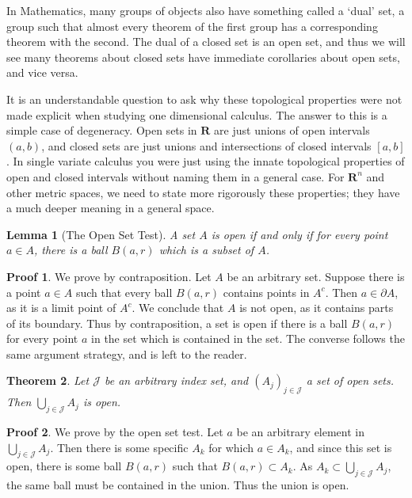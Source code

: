 \documentclass[12pt]{amsbook}
\theoremstyle{plain}
\newtheorem{theorem}{Theorem}
\newtheorem{lemma}[theorem]{Lemma}
\theoremstyle{definition}
\newtheorem*{prf}{Proof}
\begin{document}
In Mathematics, many groups of objects also have something called a `dual' set, a group such that almost every theorem of the first group has a corresponding theorem with the second. The dual of a closed set is an open set, and thus we will see many theorems about closed sets have immediate corollaries about open sets, and vice versa.

It is an understandable question to ask why these topological properties were not made explicit when studying one dimensional calculus. The answer to this is a simple case of degeneracy. Open sets in $\mathbf{R}$ are just unions of open intervals $(a,b)$, and closed sets are just unions and intersections of closed intervals $[a,b]$. In single variate calculus you were just using the innate topological properties of open and closed intervals without naming them in a general case. For $\mathbf{R}^n$ and other metric spaces, we need to state more rigorously these properties; they have a much deeper meaning in a general space.

\begin{lemma}[The Open Set Test]
  A set $A$ is open if and only if for every point $a \in A$, there is a ball $B(a,r)$ which is a subset of $A$.
\end{lemma}
\begin{prf}
  We prove by contraposition. Let $A$ be an arbitrary set. Suppose there is a point $a \in A$ such that every ball $B(a,r)$ contains points in $A^c$. Then $a \in \partial A$, as it is a limit point of $A^c$. We conclude that $A$ is not open, as it contains parts of its boundary. Thus by contraposition, a set is open if there is a ball $B(a,r)$ for every point $a$ in the set which is contained in the set. The converse follows the same argument strategy, and is left to the reader.
\end{prf}

\begin{theorem}
  Let $\mathcal{J}$ be an arbitrary index set, and $(A_j)_{j \in \mathcal{J}}$ a set of open sets. Then $\bigcup_{j \in \mathcal{J}} A_j$ is open.
\end{theorem}
\begin{prf}
  We prove by the open set test. Let $a$ be an arbitrary element in $\bigcup_{j \in \mathcal{J}} A_j$. Then there is some specific $A_k$ for which $a \in A_k$, and since this set is open, there is some ball $B(a,r)$ such that $B(a,r) \subset A_k$. As $A_k \subset \bigcup_{j \in \mathcal{J}} A_j$, the same ball must be contained in the union. Thus the union is open.
\end{prf}
\end{document}
